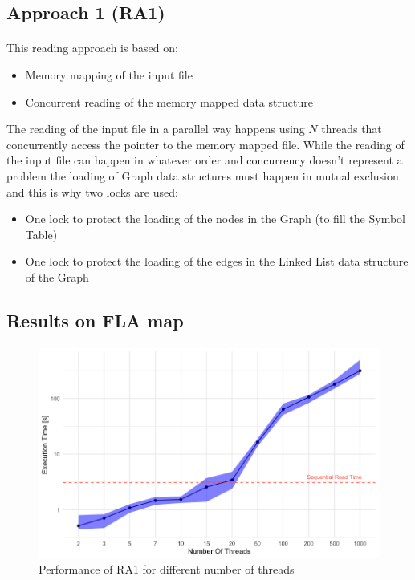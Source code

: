 \documentclass[12pt]{beamer}
\begin{document}
	\subsection{Approach 1 (RA1)}
	\begin{frame}{\secname}
		\framesubtitle{\subsecname}
		This reading approach is based on:
		\begin{itemize}
			\item Memory mapping of the input file
			\item Concurrent reading of the memory mapped data structure
		\end{itemize}
		The reading of the input file in a parallel way happens using $N$ threads that concurrently access
		the pointer to the memory mapped file. While the reading of the input file can happen in whatever order
		and concurrency doesn't represent a problem the loading of Graph data structures must happen in
		mutual exclusion and this is why two locks are used:
		\begin{itemize}
			\item One lock to protect the loading of the nodes in the Graph (to fill the Symbol Table)
			\item One lock to protect the loading of the edges in the Linked List data structure of the Graph
		\end{itemize}
	\end{frame}
	\subsection{Results on FLA map}
	\begin{frame}{\secname}
		\framesubtitle{\subsecname}
		\begin{figure}[ht!]
			\centering
			\includegraphics[width=0.85\linewidth]{read/par_read_1_time.png}
			\caption{Performance of RA1 for different number of threads}
			\label{parread1time}
	 	 \end{figure}	
	\end{frame}
\end{document}
